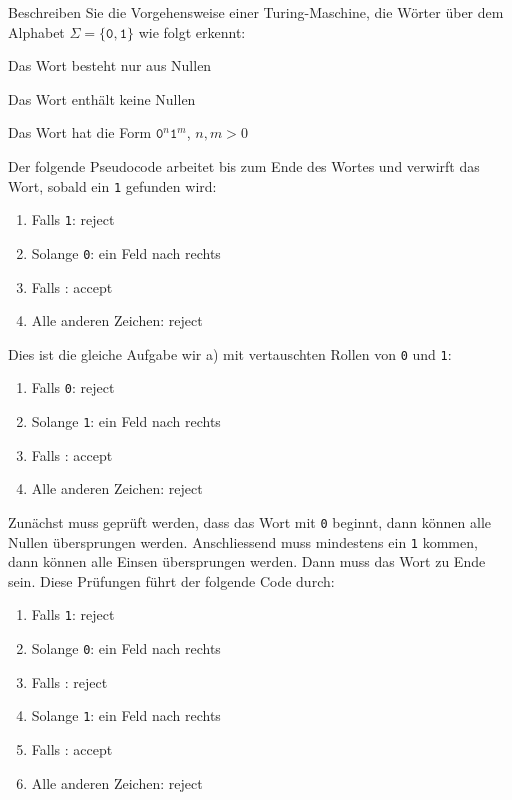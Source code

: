 Beschreiben Sie die Vorgehensweise einer Turing-Maschine, die Wörter
über dem Alphabet $\Sigma=\{\texttt{0},\texttt{1}\}$ wie folgt erkennt:
\begin{teilaufgaben}
\item Das Wort besteht nur aus Nullen
\item Das Wort enthält keine Nullen
\item Das Wort hat die Form $\texttt{0}^n\texttt{1}^m$, $n,m>0$
\end{teilaufgaben}

\begin{loesung}
\begin{teilaufgaben}
\item 
Der folgende Pseudocode arbeitet bis zum Ende des Wortes und verwirft
das Wort, sobald ein \texttt{1} gefunden wird:
\begin{enumerate}[1.]
\item Falls \texttt{1}: {\color{darkred}reject}
\item Solange \texttt{0}: ein Feld nach rechts
\item Falls \blank: {\color{darkgreen}accept}
\item Alle anderen Zeichen: {\color{darkred}reject}
\end{enumerate}
\item 
Dies ist die gleiche Aufgabe wir a) mit vertauschten Rollen von
\texttt{0} und \texttt{1}:
\begin{enumerate}[1.]
\item Falls \texttt{0}: {\color{darkred}reject}
\item Solange \texttt{1}: ein Feld nach rechts
\item Falls \blank: {\color{darkgreen}accept}
\item Alle anderen Zeichen: {\color{darkred}reject}
\end{enumerate}
\item
Zunächst muss geprüft werden, dass das Wort mit \texttt{0} beginnt,
dann können alle Nullen übersprungen werden.
Anschliessend muss mindestens ein \texttt{1} kommen, dann können alle
Einsen übersprungen werden.
Dann muss das Wort zu Ende sein.
Diese Prüfungen führt der folgende Code durch:
\begin{enumerate}[1.]
\item Falls \texttt{1}: {\color{darkred}reject}
\item Solange \texttt{0}: ein Feld nach rechts
\item Falls \blank: {\color{darkred}reject}
\item Solange \texttt{1}: ein Feld nach rechts
\item Falls \blank: {\color{darkgreen}accept}
\item Alle anderen Zeichen: {\color{darkred}reject}
\end{enumerate}
\end{teilaufgaben}
\end{loesung}
